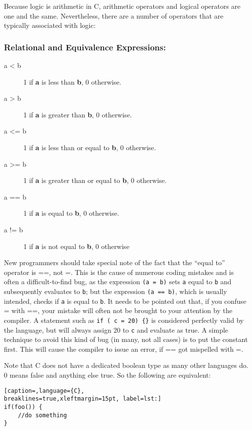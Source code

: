 Because logic is arithmetic in C, arithmetic operators and logical operators
are one and the same. Nevertheless, there are a number of operators that are
typically associated with logic:

\subsubsection{Relational and Equivalence Expressions:}
\begin{description}
	\item[a \textless{} b] 1 if \textbf{a} is less than \textbf{b}, 0 otherwise.
	\item[a \textgreater{} b] 1 if \textbf{a} is greater than \textbf{b}, 0 otherwise.
	\item[a \textless{}= b] 1 if \textbf{a} is less than or equal to \textbf{b}, 0 otherwise.
	\item[a \textgreater{}= b] 1 if \textbf{a} is greater than or equal to \textbf{b}, 0 otherwise.
	\item[a == b] 1 if \textbf{a} is equal to \textbf{b}, 0 otherwise.
	\item[a != b] 1 if \textbf{a} is not equal to \textbf{b}, 0 otherwise
\end{description}

New programmers should take special note of the fact that the ``equal to''
operator is ==, not =. This is the cause of numerous coding mistakes and is
often a difficult-to-find bug, as the expression \texttt{(a = b)} sets
\texttt{a} equal to \texttt{b} and subsequently evaluates to \texttt{b}; but
the expression \texttt{(a == b)}, which is usually intended, checks if
\texttt{a} is equal to \texttt{b}. It needs to be pointed out that, if you
confuse = with ==, your mistake will often not be brought to your attention by
the compiler. A statement such as \texttt{if ( c = 20) \{\}} is considered
perfectly valid by the language, but will always assign 20 to \texttt{c} and
evaluate as true. A simple technique to avoid this kind of bug (in many, not
all cases) is to put the constant first. This will cause the compiler to issue
an error, if == got mispelled with =.

Note that C does not have a dedicated boolean type as many other languages do.
0 means false and anything else true. So the following are equivalent:
\lstset{basicstyle=\scriptsize, numbers=left, captionpos=b, tabsize=4}
\begin{lstlisting}[caption=,language={C},
breaklines=true,xleftmargin=15pt, label=lst:]
if(foo()) {
	//do something
}
\end{lstlisting}

